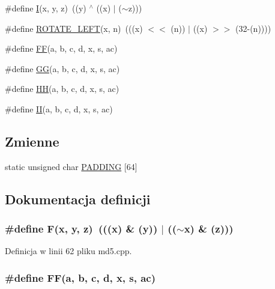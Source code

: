 \begin{CompactItemize}
\#define \hyperlink{a00010_c0eafdc9ee161b71e7af98af736952fd}{I}(x, y, z)~((y) $^\wedge$ ((x) $|$ ($\sim$z)))
\item 
\#define \hyperlink{a00010_7417fd4e875360c0533fa5b412cdab49}{ROTATE\_\-LEFT}(x, n)~(((x) $<$$<$ (n)) $|$ ((x) $>$$>$ (32-(n))))
\item 
\#define \hyperlink{a00010_0a143972cb6c4fe16f0ffa8a3d41ebf3}{FF}(a, b, c, d, x, s, ac)
\item 
\#define \hyperlink{a00010_685f32faa2a66e743850b990a13b8bfa}{GG}(a, b, c, d, x, s, ac)
\item 
\#define \hyperlink{a00010_8b9f1c4778df01ef970b87dbe5541dc5}{HH}(a, b, c, d, x, s, ac)
\item 
\#define \hyperlink{a00010_d26626e5efb37b2dadef4e88e35e4329}{II}(a, b, c, d, x, s, ac)
\end{CompactItemize}
\subsection*{Zmienne}
\begin{CompactItemize}
\item 
static unsigned char \hyperlink{a00010_ee6f420120b0fbc0fb096cb61655cec4}{PADDING} \mbox{[}64\mbox{]}
\end{CompactItemize}


\subsection{Dokumentacja definicji}
\hypertarget{a00010_96d73bbd7af15cb1fc38c3f4a3bd82e9}{
\subsubsection[{F}]{\setlength{\rightskip}{0pt plus 5cm}\#define F(x, \/  y, \/  z)~(((x) \& (y)) $|$ (($\sim$x) \& (z)))}}
\label{d7/dec/a00010_96d73bbd7af15cb1fc38c3f4a3bd82e9}




Definicja w linii 62 pliku md5.cpp.\hypertarget{a00010_0a143972cb6c4fe16f0ffa8a3d41ebf3}{
\subsubsection[{FF}]{\setlength{\rightskip}{0pt plus 5cm}\#define FF(a, \/  b, \/  c, \/  d, \/  x, \/  s, \/  ac)}}
\label{d7/dec/a00010_0a143972cb6c4fe16f0ffa8a3d41ebf3}


